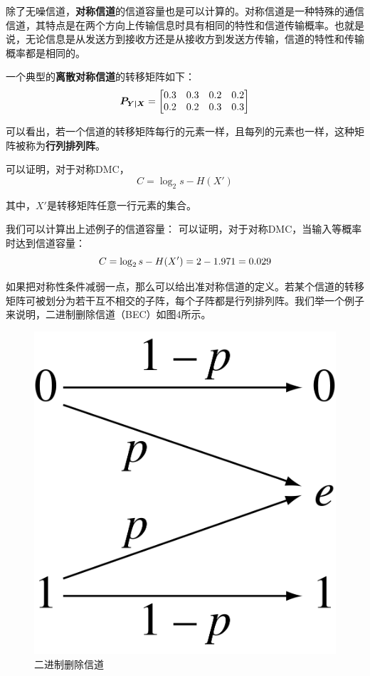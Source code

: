 \documentclass[UTF8,a4paper,11pt]{article}
\begin{document}
除了无噪信道，\textbf{对称信道}的信道容量也是可以计算的。对称信道是一种特殊的通信信道，其特点是在两个方向上传输信息时具有相同的特性和信道传输概率。也就是说，无论信息是从发送方到接收方还是从接收方到发送方传输，信道的特性和传输概率都是相同的。

一个典型的\textbf{离散对称信道}的转移矩阵如下：
\begin{equation}
\notag
\bm{P_{Y|X}}=
\begin{bmatrix}
0.3&0.3&0.2&0.2\\
0.2&0.2&0.3&0.3\\
\end{bmatrix}
\end{equation}

可以看出，若一个信道的转移矩阵每行的元素一样，且每列的元素也一样，这种矩阵被称为\textbf{行列排列阵}。


可以证明，对于对称DMC，
\begin{equation}
C=\log_{2}{s}-H(X')
\end{equation}

其中，$X'$是转移矩阵任意一行元素的集合。

我们可以计算出上述例子的信道容量：
可以证明，对于对称DMC，当输入等概率时达到信道容量：
\begin{equation}
\notag
C=\log_{2}{s}-H(X')=2-1.971=0.029
\end{equation}

如果把对称性条件减弱一点，那么可以给出准对称信道的定义。若某个信道的转移矩阵可被划分为若干互不相交的子阵，每个子阵都是行列排列阵。我们举一个例子来说明，二进制删除信道（BEC）如图4所示。
\begin{figure}[htbp]
\centering
\includegraphics[scale=0.15]{p4.png}
\caption{二进制删除信道}
\end{figure}
\end{document}
